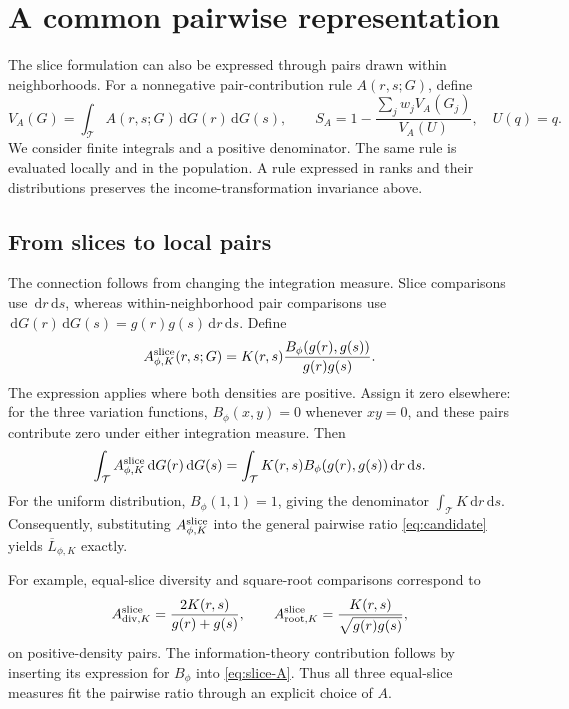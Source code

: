\documentclass[11pt]{article}
\newcommand{\dd}{\,\mathrm{d}}
\newcommand{\T}{\mathcal{T}}
\begin{document}
\section{A common pairwise representation}
\label{sec:pairwise}

The slice formulation can also be expressed through pairs drawn within neighborhoods. For a nonnegative pair-contribution rule $A(r,s;G)$, define
\begin{equation}
V_A(G)=\int_{\T}A(r,s;G)\dd G(r)\dd G(s),\qquad
S_A=1-\frac{\sum_jw_jV_A(G_j)}{V_A(U)},\quad U(q)=q.
\label{eq:candidate}
\end{equation}
We consider finite integrals and a positive denominator. The same rule is evaluated locally and in the population. A rule expressed in ranks and their distributions preserves the income-transformation invariance above.

\subsection{From slices to local pairs}

The connection follows from changing the integration measure. Slice comparisons use $\dd r\dd s$, whereas within-neighborhood pair comparisons use
$\dd G(r)\dd G(s)=g(r)g(s)\dd r\dd s$. Define
\begin{equation}
A^{\rm slice}_{\phi,K}(r,s;G)
=K(r,s)\frac{B_\phi(g(r),g(s))}{g(r)g(s)}.
\label{eq:slice-A}
\end{equation}
The expression applies where both densities are positive. Assign it zero elsewhere: for the three variation functions, $B_\phi(x,y)=0$ whenever $xy=0$, and these pairs contribute zero under either integration measure. Then
\begin{equation}
\int_{\T} A^{\rm slice}_{\phi,K}\dd G(r)\dd G(s)
=\int_{\T} K(r,s)B_\phi(g(r),g(s))\dd r\dd s.
\label{eq:forward}
\end{equation}
For the uniform distribution, $B_\phi(1,1)=1$, giving the denominator $\int_{\T}K\dd r\dd s$. Consequently, substituting $A^{\rm slice}_{\phi,K}$ into the general pairwise ratio \eqref{eq:candidate} yields $\overline L_{\phi,K}$ exactly.

For example, equal-slice diversity and square-root comparisons correspond to
\[
A^{\rm slice}_{{\rm div},K}=\frac{2K(r,s)}{g(r)+g(s)},
\qquad
A^{\rm slice}_{{\rm root},K}=\frac{K(r,s)}{\sqrt{g(r)g(s)}},
\]
on positive-density pairs. The information-theory contribution follows by inserting its expression for $B_\phi$ into \eqref{eq:slice-A}. Thus all three equal-slice measures fit the pairwise ratio through an explicit choice of $A$.
\end{document}
